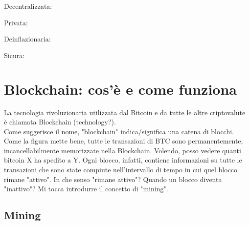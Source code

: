 \documentclass {article}
\begin{document}
Decentralizzata:

Privata:

Deinflazionaria:

Sicura:


\section {Blockchain: cos'è e come funziona}


La tecnologia rivoluzionaria utilizzata dal Bitcoin e da tutte le altre criptovalute è chiamata Blockchain (technology?).\\
Come suggerisce il nome, "blockchain" indica/significa una catena di blocchi.
Come la figura mette bene, tutte le transazioni di BTC sono permanentemente, incancellabilmente memorizzate nella Blockchain.
Volendo, posso vedere quanti bitcoin X ha spedito a Y. Ogni blocco, infatti, contiene informazioni su tutte le transazioni che sono state compiute nell'intervallo di tempo in cui quel blocco rimane "attivo".
In che senso "rimane attivo"? Quando un blocco diventa "inattivo"?
Mi tocca introdurre il concetto di "mining".


\subsection {Mining}
\end{document}
